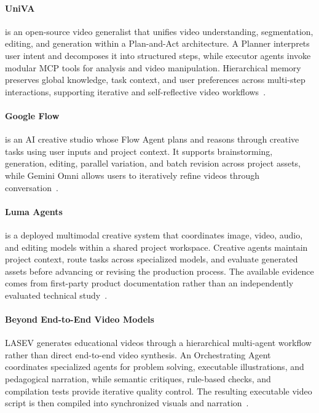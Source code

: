 \paragraph{UniVA}
 is an open-source video generalist that unifies video understanding, segmentation, editing, and generation within a Plan-and-Act architecture. A Planner interprets user intent and decomposes it into structured steps, while executor agents invoke modular MCP tools for analysis and video manipulation. Hierarchical memory preserves global knowledge, task context, and user preferences across multi-step interactions, supporting iterative and self-reflective video workflows~\cite{avg251108521}.

\paragraph{Google Flow}
 is an AI creative studio whose Flow Agent plans and reasons through creative tasks using user inputs and project context. It supports brainstorming, generation, editing, parallel variation, and batch revision across project assets, while Gemini Omni allows users to iteratively refine videos through conversation~\cite{roman2026flowagents}.

 \paragraph{Luma Agents}
 is a deployed multimodal creative system that coordinates image, video, audio, and editing models within a shared project workspace. Creative agents maintain project context, route tasks across specialized models, and evaluate generated assets before advancing or revising the production process. The available evidence comes from first-party product documentation rather than an independently evaluated technical study~\cite{luma2026agents}.

\paragraph{Beyond End-to-End Video Models}
LASEV generates educational videos through a hierarchical multi-agent workflow rather than direct end-to-end video synthesis. An Orchestrating Agent coordinates specialized agents for problem solving, executable illustrations, and pedagogical narration, while semantic critiques, rule-based checks, and compilation tests provide iterative quality control. The resulting executable video script is then compiled into synchronized visuals and narration~\cite{avg260211790}.


